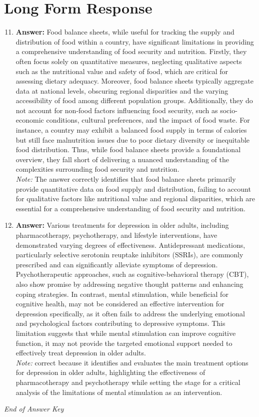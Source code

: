\documentclass[12pt]{article}
\begin{document}
\section*{Long Form Response}
\begin{enumerate}[label=\arabic*.]
\setcounter{enumi}{10}
\item \textbf{Answer:} Food balance sheets, while useful for tracking the supply and distribution of food within a country, have significant limitations in providing a comprehensive understanding of food security and nutrition. Firstly, they often focus solely on quantitative measures, neglecting qualitative aspects such as the nutritional value and safety of food, which are critical for assessing dietary adequacy. Moreover, food balance sheets typically aggregate data at national levels, obscuring regional disparities and the varying accessibility of food among different population groups. Additionally, they do not account for non-food factors influencing food security, such as socio-economic conditions, cultural preferences, and the impact of food waste. For instance, a country may exhibit a balanced food supply in terms of calories but still face malnutrition issues due to poor dietary diversity or inequitable food distribution. Thus, while food balance sheets provide a foundational overview, they fall short of delivering a nuanced understanding of the complexities surrounding food security and nutrition.
\\ \textit{Note:} The answer correctly identifies that food balance sheets primarily provide quantitative data on food supply and distribution, failing to account for qualitative factors like nutritional value and regional disparities, which are essential for a comprehensive understanding of food security and nutrition.
\item \textbf{Answer:} Various treatments for depression in older adults, including pharmacotherapy, psychotherapy, and lifestyle interventions, have demonstrated varying degrees of effectiveness. Antidepressant medications, particularly selective serotonin reuptake inhibitors (SSRIs), are commonly prescribed and can significantly alleviate symptoms of depression. Psychotherapeutic approaches, such as cognitive-behavioral therapy (CBT), also show promise by addressing negative thought patterns and enhancing coping strategies. In contrast, mental stimulation, while beneficial for cognitive health, may not be considered an effective intervention for depression specifically, as it often fails to address the underlying emotional and psychological factors contributing to depressive symptoms. This limitation suggests that while mental stimulation can improve cognitive function, it may not provide the targeted emotional support needed to effectively treat depression in older adults.
\\ \textit{Note:} correct because it identifies and evaluates the main treatment options for depression in older adults, highlighting the effectiveness of pharmacotherapy and psychotherapy while setting the stage for a critical analysis of the limitations of mental stimulation as an intervention.
\end{enumerate}

\vfill
\noindent\textit{End of Answer Key}
\end{document}
